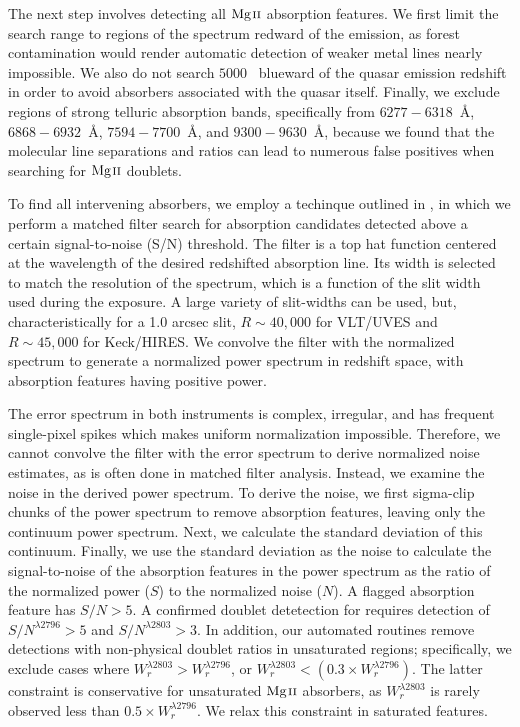 \documentclass[iop,apj,numberedappendix,appendixfloats,twocolappendix]{emulateapj}
\begin{document}
The next step involves detecting all ${\hbox{{\rm Mg}\kern 0.1em{\sc ii}}}$ absorption features. We first limit the search range to regions of the spectrum redward of the {\Lya} emission, as {\Lya} forest contamination would render automatic detection of weaker metal lines nearly impossible. We also do not search $5000$~{\kms} blueward of the quasar emission redshift in order to avoid absorbers associated with the quasar itself. Finally, we exclude regions of strong telluric absorption bands, specifically from $6277 - 6318$~{\AA}, $6868 - 6932$~{\AA}, $7594 - 7700$~{\AA}, and $9300 - 9630$~{\AA}, because we found that the molecular line separations and ratios can lead to numerous false positives when searching for ${\hbox{{\rm Mg}\kern 0.1em{\sc ii}}}$ doublets. 

To find all intervening {\MgIIdblt} absorbers, we employ a techinque outlined in \cite{Zhu2013}, in which we perform a matched filter search for absorption candidates detected above a certain signal-to-noise (S/N) threshold. The filter is a top hat function centered at the wavelength of the desired redshifted absorption line. Its width is selected to match the resolution of the spectrum, which is a function of the slit width used during the exposure. A large variety of slit-widths can be used, but, characteristically for a 1.0 arcsec slit, $R \sim 40,000$ for VLT/UVES and $R \sim 45,000$ for Keck/HIRES. We convolve the filter with the normalized spectrum to generate a normalized power spectrum in redshift space, with absorption features having positive power. 


The error spectrum in both instruments is complex, irregular, and has frequent single-pixel spikes which makes uniform normalization impossible. Therefore, we cannot convolve the filter with the error spectrum to derive normalized noise estimates, as is often done in matched filter analysis. Instead, we examine the noise in the derived power spectrum. To derive the noise, we first sigma-clip chunks of the power spectrum to remove absorption features, leaving only the continuum power spectrum. Next, we calculate the standard deviation of this continuum. Finally, we use the standard deviation as the noise to calculate the signal-to-noise of the absorption features in the power spectrum as the ratio of the normalized power ($S$) to the normalized noise ($N$). A flagged absorption feature has $S/N > 5$. A confirmed doublet detetection for {\MgIIdblt} requires detection of $S/N^{\lambda2796} > 5$ and $S/N^{\lambda2803} > 3$. In addition, our automated routines remove detections with non-physical doublet ratios in unsaturated regions; specifically, we exclude cases where $W_r^{\lambda2803} > W_r^{\lambda2796}$, or $W_r^{\lambda2803} < \left(0.3 \times W_r^{\lambda2796}\right)$. The latter constraint is conservative for unsaturated ${\hbox{{\rm Mg}\kern 0.1em{\sc ii}}}$ absorbers, as $W_r^{\lambda2803}$ is rarely observed less than $0.5 \times W_r^{\lambda2796}$. We relax this constraint in saturated features. 
\end{document}
